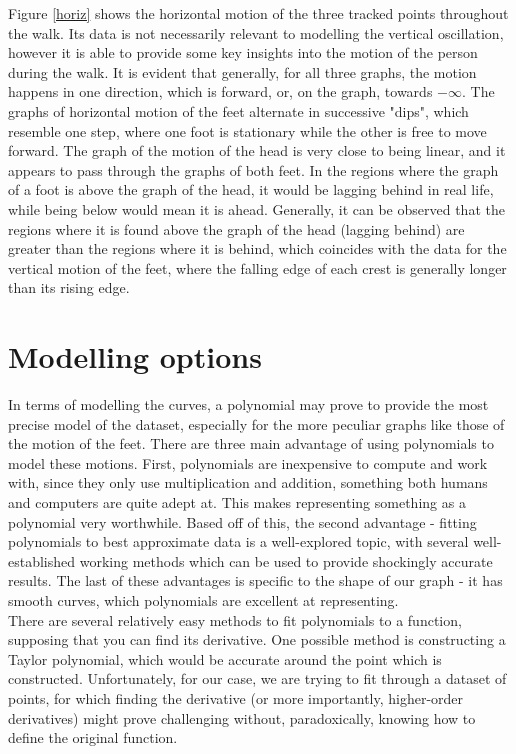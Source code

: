 \documentclass[12pt, a4paper]{article}
\begin{document}
Figure \ref{horiz} shows the horizontal motion of the three tracked points
throughout the walk. Its data is not necessarily relevant to modelling the
vertical oscillation, however it is able to provide some key insights into the
motion of the person during the walk. It is evident that generally, for all
three graphs, the motion happens in one direction, which is forward, or, on the
graph, towards $-\infty$. The graphs of horizontal motion of the feet alternate
in successive "dips", which resemble one step, where one foot is stationary
while the other is free to move forward. The graph of the motion of the head is
very close to being linear, and it appears to pass through the graphs of both
feet. In the regions where the graph of a foot is above the graph of the head,
it would be lagging behind in real life, while being below would mean it is
ahead. Generally, it can be observed that the regions where it is found above
the graph of the head (lagging behind) are greater than the regions where it is
behind, which coincides with the data for the vertical motion of the feet, where
the falling edge of each crest is generally longer than its rising edge.

\section{Modelling options}
In terms of modelling the curves, a polynomial may prove to provide the most
precise model of the dataset, especially for the more peculiar graphs like those
of the motion of the feet. There are three main advantage of using polynomials
to model these motions. First, polynomials are inexpensive to compute and work
with, since they only use multiplication and addition, something both humans and
computers are quite adept at. This makes representing something as a polynomial
very worthwhile. Based off of this, the second advantage - fitting polynomials
to best approximate data is a well-explored topic, with several well-established
working methods which can be used to provide shockingly accurate results. The
last of these advantages is specific to the shape of our graph - it has smooth
curves, which polynomials are excellent at representing. \\

There are several relatively easy methods to fit polynomials to a function,
supposing that you can find its derivative. One possible method is constructing
a Taylor polynomial, which would be accurate around the point which is
constructed. Unfortunately, for our case, we are trying to fit through a dataset
of points, for which finding the derivative (or more importantly, higher-order
derivatives) might prove challenging without, paradoxically, knowing how to
define the original function. \\
\end{document}
